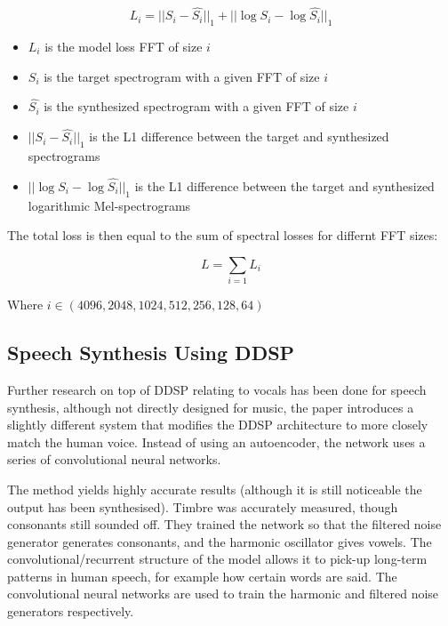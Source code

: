 \vspace{0.5cm}
\vspace{0.5cm}

\begin{equation}
    L_i = ||S_i - \hat{S_i}||_1 + ||\log{S_i} - \log\hat{S_i}||_1
\end{equation}

\begin{itemize}
    \item $L_i$ is the model loss FFT of size $i$
    \item $S_i$ is the target spectrogram with a given FFT of size $i$
    \item $\hat{S_i}$ is the synthesized spectrogram with a given FFT of size $i$
    \item $||S_i - \hat{S_i}||_1$ is the L1 difference between the target and synthesized spectrograms
    \item $||\log{S_i} - \log\hat{S_i}||_1$ is the L1 difference between the target and synthesized logarithmic Mel-spectrograms
\end{itemize}

The total loss is then equal to the sum of spectral losses for differnt FFT sizes:

\begin{equation}
    L = \sum_{i=1} L_i
\end{equation}

Where $i \in (4096, 2048, 1024, 512, 256, 128, 64)$

\subsection{Speech Synthesis Using DDSP}

Further research on top of DDSP relating to vocals has been done for speech synthesis, although not directly designed for music, the paper introduces a slightly different system that modifies the DDSP architecture to more closely match the human voice\cite{SpeechDDSP}. Instead of using an autoencoder, the network uses a series of convolutional neural networks.

The method yields highly accurate results (although it is still noticeable the output has been synthesised). Timbre was accurately measured, though consonants still sounded off. They trained the network so that the filtered noise generator generates consonants, and the harmonic oscillator gives vowels. The convolutional/recurrent structure of the model allows it to pick-up long-term patterns in human speech, for example how certain words are said. The convolutional neural networks are used to train the harmonic and filtered noise generators respectively.

